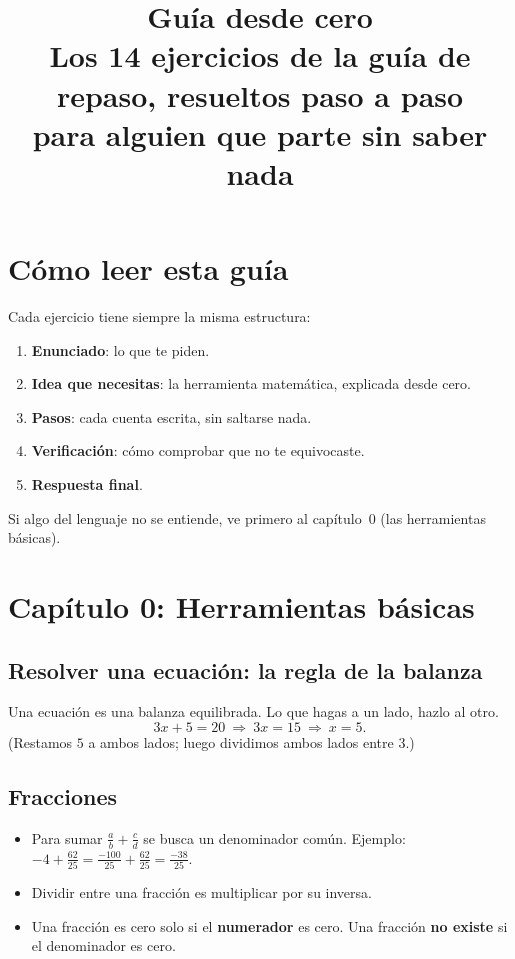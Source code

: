 \documentclass[11pt,a4paper]{article}
\title{\textbf{Guía desde cero}\\[0.4em]
\large Los 14 ejercicios de la guía de repaso, resueltos paso a paso\\
para alguien que parte sin saber nada}
\author{}
\date{}
\begin{document}
\maketitle
\thispagestyle{fancy}
\tableofcontents
\newpage

\section*{Cómo leer esta guía}
Cada ejercicio tiene siempre la misma estructura:
\begin{enumerate}[nosep]
  \item \textbf{Enunciado}: lo que te piden.
  \item \textbf{Idea que necesitas}: la herramienta matemática, explicada desde cero.
  \item \textbf{Pasos}: cada cuenta escrita, sin saltarse nada.
  \item \textbf{Verificación}: cómo comprobar que no te equivocaste.
  \item \textbf{Respuesta final}.
\end{enumerate}
Si algo del lenguaje no se entiende, ve primero al capítulo~0 (las herramientas básicas).

\newpage
\section{Capítulo 0: Herramientas básicas}

\subsection{Resolver una ecuación: la regla de la balanza}
Una ecuación es una balanza equilibrada. Lo que hagas a un lado, hazlo al otro.
\[ 3x+5=20\ \Rightarrow\ 3x=15\ \Rightarrow\ x=5. \]
(Restamos $5$ a ambos lados; luego dividimos ambos lados entre $3$.)

\subsection{Fracciones}
\begin{itemize}[nosep]
  \item Para sumar $\frac ab+\frac cd$ se busca un denominador común. Ejemplo: $-4+\frac{62}{25}=\frac{-100}{25}+\frac{62}{25}=\frac{-38}{25}$.
  \item Dividir entre una fracción es multiplicar por su inversa.
  \item Una fracción es cero solo si el \textbf{numerador} es cero. Una fracción \textbf{no existe} si el denominador es cero.
\end{itemize}
\end{document}

